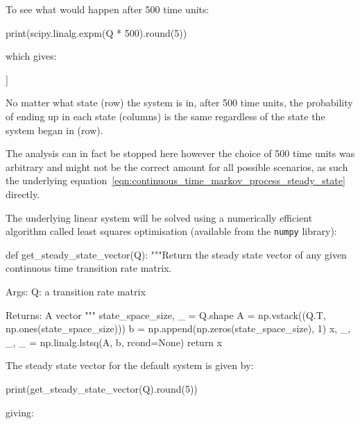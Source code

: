 To see what would happen after 500 time units:

\begin{pyin}
print(scipy.linalg.expm(Q * 500).round(5))
\end{pyin}

which gives:

\begin{pyout}
[[0.03431 0.08577 0.10722 0.13402 0.16752 0.2094  0.26176]
 [0.03431 0.08577 0.10722 0.13402 0.16752 0.2094  0.26176]
 [0.03431 0.08577 0.10722 0.13402 0.16752 0.2094  0.26176]
 [0.03431 0.08577 0.10722 0.13402 0.16752 0.2094  0.26176]
 [0.03431 0.08577 0.10722 0.13402 0.16752 0.2094  0.26176]
 [0.03431 0.08577 0.10722 0.13402 0.16752 0.2094  0.26176]
 [0.03431 0.08577 0.10722 0.13402 0.16752 0.2094  0.26176]]
\end{pyout}

No matter what state (row) the system is in,
after 500 time units, the probability of ending up in each state (columns) is
the same regardless of the state the system began in (row).

The analysis can in fact be stopped here
however the choice of 500 time units was arbitrary and might not be the correct
amount for all possible scenarios, as such the
underlying equation~\ref{eqn:continuous_time_markov_process_steady_state}
directly.

The underlying linear system will be solved using a numerically efficient
algorithm called least squares optimisation (available from the
\texttt{numpy} library):

\begin{pyin}
def get_steady_state_vector(Q):
    """Return the steady state vector of any given continuous
    time transition rate matrix.

    Args:
       Q: a transition rate matrix

    Returns:
        A vector
    """
    state_space_size, _ = Q.shape
    A = np.vstack((Q.T, np.ones(state_space_size)))
    b = np.append(np.zeros(state_space_size), 1)
    x, _, _, _ = np.linalg.lstsq(A, b, rcond=None)
    return x
\end{pyin}

The steady state vector for the default system is given by:

\begin{pyin}
print(get_steady_state_vector(Q).round(5))
\end{pyin}

giving:

\begin{pyout}
[0.03431 0.08577 0.10722 0.13402 0.16752 0.2094  0.26176]
\end{pyout}

